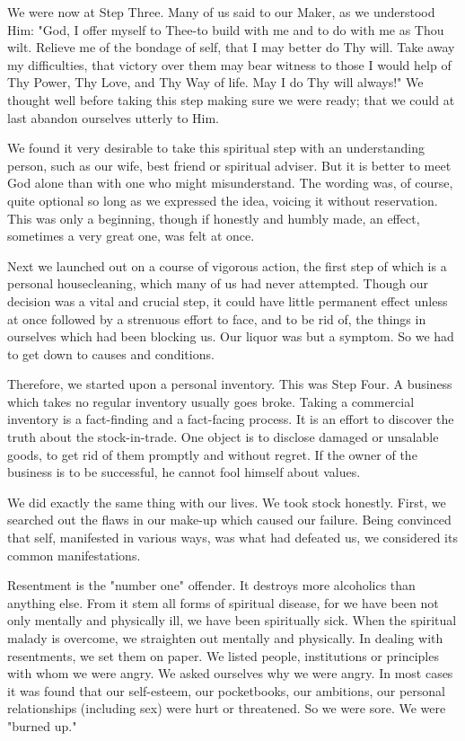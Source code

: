 \begin{biblechapter}
We were now at Step Three.  Many of us said to our Maker, as we understood Him: "God, I offer myself to Thee-to build with me and to do with me as Thou wilt.  Relieve me of the bondage of self, that I may better do Thy will.  Take away my difficulties, that victory over them may bear witness to those I would help of Thy Power, Thy Love, and Thy Way of life.  May I do Thy will always!"  We thought well before taking this step making sure we were ready; that we could at last abandon ourselves utterly to Him.

We found it very desirable to take this spiritual step with an understanding person, such as our wife, best friend or spiritual adviser.  But it is better to meet God alone than with one who might misunderstand.  The wording was, of course, quite optional so long as we expressed the idea, voicing it without reservation.  This was only a beginning, though if honestly and humbly made, an effect, sometimes a very great one, was felt at once.

Next we launched out on a course of vigorous action, the first step of which is a personal housecleaning, which many of us had never attempted.  Though our  decision was a vital and crucial step, it could have little permanent effect unless at once followed by a strenuous effort to face, and to be rid of, the things in ourselves which had been blocking us.  Our liquor was but a symptom.  So we had to get down to causes and conditions.

Therefore, we started upon a personal inventory.  This was Step Four.  A business which takes no regular inventory usually goes broke.  Taking a commercial  inventory is a fact-finding and a fact-facing process.  It is an effort to discover the truth about the stock-in-trade.  One object is to disclose damaged or unsalable goods, to get rid of them promptly and without regret.  If the owner of the business is to be successful, he cannot fool himself about values.

We did exactly the same thing with our lives.  We took stock honestly.  First, we searched out the flaws in our make-up which caused our failure.  Being convinced that self, manifested in various ways, was what had defeated us, we considered its common manifestations.

Resentment is the "number one" offender.  It destroys more alcoholics than anything else.  From it stem all forms of spiritual disease, for we have been not only mentally and physically ill, we have been spiritually sick.  When the spiritual malady is overcome, we straighten out mentally and physically.  In dealing with resentments, we set them on paper.  We listed people, institutions or principles with whom we were angry.  We asked ourselves why we were angry.  In most cases it was found that our self-esteem, our pocketbooks, our ambitions, our personal relationships (including sex) were hurt or threatened.  So we were sore.  We were "burned up."


\end{biblechapter}
